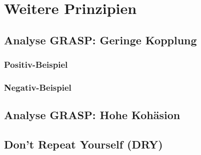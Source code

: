 \chapter{Weitere Prinzipien}

\section{Analyse GRASP: Geringe Kopplung}

\subsection{Positiv-Beispiel}

\subsection{Negativ-Beispiel}

\section{Analyse GRASP: Hohe Kohäsion}

\section{Don't Repeat Yourself (DRY)}
